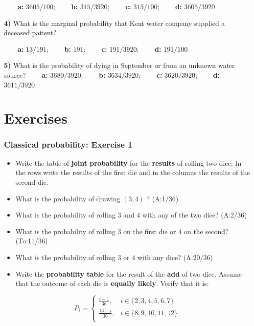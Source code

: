 \documentclass[
]{book}
\begin{document}
\textbf{\(\qquad\)a:} \(3605/100\); \textbf{\(\qquad\)b:} \(315/3920\); \textbf{\(\qquad\)c:} \(315/100\); \textbf{\(\qquad\)d:} \(3605/3920\)

\textbf{4)} What is the marginal probability that Kent water company supplied a deceased patient?

\textbf{\(\qquad\)a:} \(13/191\); \textbf{\(\qquad\)b:} \(191\); \textbf{\(\qquad\)c:} \(191/3920\); \textbf{\(\qquad\)d:} \(191/100\)

\textbf{5)} What is the probability of dying in September or from an unknown water source?
\textbf{\(\qquad\)a:} \(3680/3920\); \textbf{\(\qquad\)b:} \(3634/3920\); \textbf{\(\qquad\)c:} \(3620/3920\); \textbf{\(\qquad\)d:} \(3611/3920\)

\hypertarget{exercises-1}{%
\section{Exercises}\label{exercises-1}}

\hypertarget{classical-probability-exercise-1}{%
\subsubsection{Classical probability: Exercise 1}\label{classical-probability-exercise-1}}

\begin{itemize}
\item
  Write the table of \textbf{joint probability} for the \textbf{results} of rolling two dice; In the rows write the results of the first die and in the columns the results of the second die.
\item
  What is the probability of drawing \((3, 4)\) ? (A:1/36)
\item
  What is the probability of rolling \(3\) and \(4\) with any of the two dice? (A:2/36)
\item
  What is the probability of rolling \(3\) on the first die or \(4\) on the second? (To:11/36)
\item
  What is the probability of rolling \(3\) or \(4\) with any dice? (A:20/36)
\item
  Write the \textbf{probability table} for the result of the \textbf{add} of two dice. Assume that the outcome of each die is \textbf{equally likely}. Verify that it is:
\end{itemize}

\[
P_i=
\begin{cases}
\frac{i-1}{36},& i \in \{2,3,4,5,6, 7\} \\
\frac{13-i}{36},& i \in \{8,9,10,11,12\} \\
\end{cases}
\]
\end{document}
